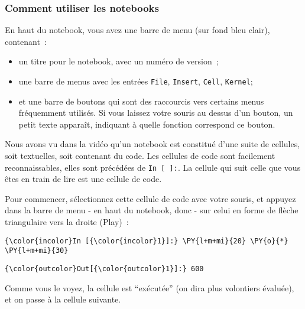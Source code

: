     \hypertarget{comment-utiliser-les-notebooks}{%
\subsubsection{Comment utiliser les
notebooks}\label{comment-utiliser-les-notebooks}}

    En haut du notebook, vous avez une barre de menu (sur fond bleu clair),
contenant~:

\begin{itemize}
\tightlist
\item
  un titre pour le notebook, avec un numéro de version~;
\item
  une barre de menus avec les entrées \texttt{File}, \texttt{Insert},
  \texttt{Cell}, \texttt{Kernel};
\item
  et une barre de boutons qui sont des raccourcis vers certains menus
  fréquemment utilisés. Si vous laissez votre souris au dessus d'un
  bouton, un petit texte apparaît, indiquant à quelle fonction
  correspond ce bouton.
\end{itemize}

Nous avons vu dans la vidéo qu'un notebook est constitué d'une suite de
cellules, soit textuelles, soit contenant du code. Les cellules de code
sont facilement reconnaissables, elles sont précédées de
\texttt{In\ {[}\ {]}:}. La cellule qui suit celle que vous êtes en train
de lire est une cellule de code.

Pour commencer, sélectionnez cette cellule de code avec votre souris, et
appuyez dans la barre de menu - en haut du notebook, donc - sur celui en
forme de flèche triangulaire vers la droite (Play)~: 

    \begin{Verbatim}[commandchars=\\\{\},frame=single,framerule=0.3mm,rulecolor=\color{cellframecolor}]
{\color{incolor}In [{\color{incolor}1}]:} \PY{l+m+mi}{20} \PY{o}{*} \PY{l+m+mi}{30}
\end{Verbatim}


\begin{Verbatim}[commandchars=\\\{\},frame=single,framerule=0.3mm,rulecolor=\color{cellframecolor}]
{\color{outcolor}Out[{\color{outcolor}1}]:} 600
\end{Verbatim}
            
    Comme vous le voyez, la cellule est ``exécutée'' (on dira plus
volontiers évaluée), et on passe à la cellule suivante.


